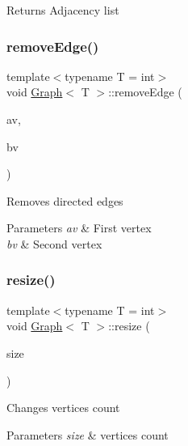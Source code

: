\begin{DoxyReturn}{Returns}
Adjacency list 
\end{DoxyReturn}
\mbox{\label{class_graph_a6f4d3afb61d592c0d7be5a347e1cffbf}} 
\subsubsection{\texorpdfstring{remove\+Edge()}{removeEdge()}}
{\footnotesize\ttfamily template$<$typename T = int$>$ \\
void \hyperlink{class_graph}{Graph}$<$ T $>$\+::remove\+Edge (\begin{DoxyParamCaption}\item[{size\+\_\+t}]{av,  }\item[{size\+\_\+t}]{bv }\end{DoxyParamCaption})\hspace{0.3cm}{\ttfamily [inline]}}

Removes directed edges 
\begin{DoxyParams}{Parameters}
{\em av} & First vertex \\
\hline
{\em bv} & Second vertex \\
\hline
\end{DoxyParams}
\mbox{\label{class_graph_a2097e3c0a42566a047e922c21ee1bb73}} 
\subsubsection{\texorpdfstring{resize()}{resize()}}
{\footnotesize\ttfamily template$<$typename T = int$>$ \\
void \hyperlink{class_graph}{Graph}$<$ T $>$\+::resize (\begin{DoxyParamCaption}\item[{size\+\_\+t}]{size }\end{DoxyParamCaption})\hspace{0.3cm}{\ttfamily [inline]}}

Changes vertices count 
\begin{DoxyParams}{Parameters}
{\em size} & vertices count \\
\hline
\end{DoxyParams}
\mbox{\label{class_graph_a27cef878a072784aeca6dc1863b39ecb}} 
